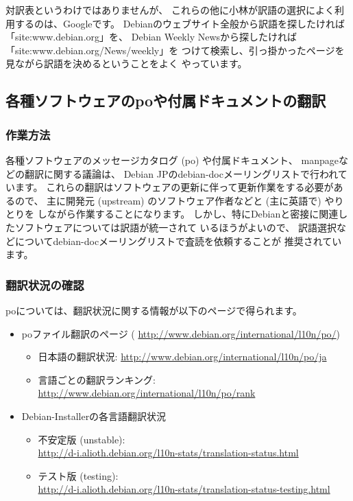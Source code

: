 \documentclass[mingoth,a4paper]{jsarticle}
\begin{document}
対訳表というわけではありませんが、
これらの他に小林が訳語の選択によく利用するのは、Googleです。
Debianのウェブサイト全般から訳語を探したければ「site:www.debian.org」を、
Debian Weekly Newsから探したければ「site:www.debian.org/News/weekly」を
つけて検索し、引っ掛かったページを見ながら訳語を決めるということをよく
やっています。

\subsection{各種ソフトウェアのpoや付属ドキュメントの翻訳}

\subsubsection{作業方法}

各種ソフトウェアのメッセージカタログ (po) や付属ドキュメント、
manpageなどの翻訳に関する議論は、
Debian JPのdebian-docメーリングリストで行われています。
これらの翻訳はソフトウェアの更新に伴って更新作業をする必要があるので、
主に開発元 (upstream) のソフトウェア作者などと (主に英語で) やりとりを
しながら作業することになります。
しかし、特にDebianと密接に関連したソフトウェアについては訳語が統一されて
いるほうがよいので、
訳語選択などについてdebian-docメーリングリストで査読を依頼することが
推奨されています。

\subsubsection{翻訳状況の確認}

poについては、翻訳状況に関する情報が以下のページで得られます。
\begin{itemize}
 \item poファイル翻訳のページ (%
       \url{http://www.debian.org/international/l10n/po/})
       \begin{itemize}
	\item 日本語の翻訳状況:
	      \url{http://www.debian.org/international/l10n/po/ja}
	\item 言語ごとの翻訳ランキング:
	      \url{http://www.debian.org/international/l10n/po/rank}
       \end{itemize}
 \item Debian-Installerの各言語翻訳状況
       \begin{itemize}
	\item 不安定版 (unstable):\\
	      \url{http://d-i.alioth.debian.org/l10n-stats/translation-status.html}
	\item テスト版 (testing):\\
	      \url{http://d-i.alioth.debian.org/l10n-stats/translation-status-testing.html}
       \end{itemize}
\end{itemize}
\end{document}
